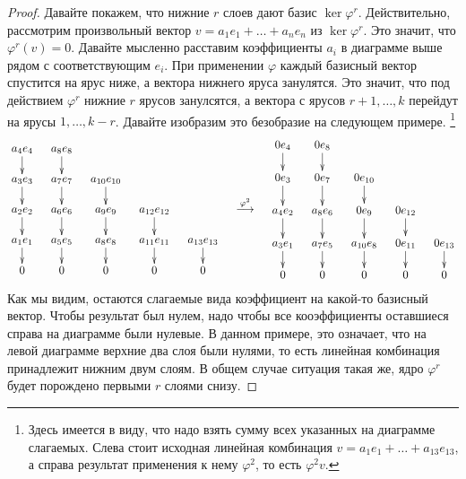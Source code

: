 \begin{proof}
Давайте покажем, что нижние $r$ слоев дают базис $\ker \varphi^r$.
Действительно, рассмотрим произвольный вектор $v = a_1 e_1 + \ldots + a_n e_n$ из $\ker \varphi^r$.
Это значит, что $\varphi^r (v) = 0$.
Давайте мысленно расставим коэффициенты $a_i$ в диаграмме выше рядом с соответствующим $e_i$.
При применении $\varphi$  каждый базисный вектор спустится на ярус ниже, а вектора нижнего яруса занулятся.
Это значит, что под действием $\varphi^r$ нижние $r$ ярусов занулсятся, а вектора с ярусов $r+1, \ldots, k$ перейдут на ярусы $1,\ldots, k-r$.
Давайте изобразим это безобразие на следующем примере.%
\footnote{Здесь имеется в виду, что надо взять сумму всех указанных на диаграмме слагаемых.
Слева стоит исходная линейная комбинация $v = a_1 e_1 + \ldots + a_{13}e_{13}$, а справа результат применения к нему $\varphi^2$, то есть $\varphi^2v$.}
\[
\begin{aligned}[c]
\xymatrix@R=15pt@C=10pt{
	{a_4e_4}\ar[d]&{a_8e_8}\ar[d]&{}&{}&{}\\
	{a_3e_3}\ar[d]&{a_7e_7}\ar[d]&{a_{10}e_{10}}\ar[d]&{}&{}\\
	{a_2e_2}\ar[d]&{a_6e_6}\ar[d]&{a_9e_9}\ar[d]&{a_{12}e_{12}}\ar[d]&{}\\
	{a_1e_1}\ar[d]&{a_5e_5}\ar[d]&{a_8e_8}\ar[d]&{a_{11}e_{11}}\ar[d]&{a_{13}e_{13}}\ar[d]\\
  {0}&{0}&{0}&{0}&{0}
}
\end{aligned}
\quad\stackrel{\varphi^2}{\longrightarrow}\quad
\begin{aligned}[c]
\xymatrix@R=15pt@C=10pt{
	{0e_4}\ar[d]&{0e_8}\ar[d]&{}&{}&{}\\
	{0e_3}\ar[d]&{0e_7}\ar[d]&{0e_{10}}\ar[d]&{}&{}\\
	{a_4e_2}\ar[d]&{a_8e_6}\ar[d]&{0e_9}\ar[d]&{0e_{12}}\ar[d]&{}\\
	{a_3e_1}\ar[d]&{a_7e_5}\ar[d]&{a_{10}e_8}\ar[d]&{0e_{11}}\ar[d]&{0e_{13}}\ar[d]\\
  {0}&{0}&{0}&{0}&{0}
}
\end{aligned}
\]
Как мы видим, остаются слагаемые вида коэффициент на какой-то базисный вектор.
Чтобы результат был нулем, надо чтобы все кооэффициенты оставшиеся справа на диаграмме были нулевые.
В данном примере, это означает, что на левой диаграмме верхние два слоя были нулями, то есть линейная комбинация принадлежит нижним двум слоям.
В общем случае ситуация такая же, ядро $\varphi^r$ будет порождено первыми $r$ слоями снизу.


\end{proof}
